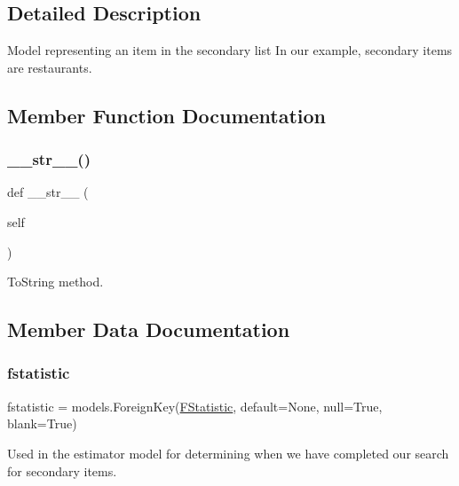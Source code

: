 \subsection{Detailed Description}
Model representing an item in the secondary list In our example, secondary items are restaurants. 

\subsection{Member Function Documentation}
\mbox{\label{classjoinapp_1_1models_1_1items_1_1_secondary_item_a23e8041ce1015febe4fdace3225714f9}} 
\subsubsection{\texorpdfstring{\_\_str\_\_()}{\_\_str\_\_()}}
{\footnotesize\ttfamily def \+\_\+\+\_\+str\+\_\+\+\_\+ (\begin{DoxyParamCaption}\item[{}]{self }\end{DoxyParamCaption})}



To\+String method. 



\subsection{Member Data Documentation}
\mbox{\label{classjoinapp_1_1models_1_1items_1_1_secondary_item_a5a67693c07b6818c102b3bfd0fc219cc}} 
\subsubsection{\texorpdfstring{fstatistic}{fstatistic}}
{\footnotesize\ttfamily fstatistic = models.\+Foreign\+Key(\mbox{\hyperlink{classjoinapp_1_1models_1_1estimator_1_1_f_statistic}{F\+Statistic}}, default=None, null=True, blank=True)\hspace{0.3cm}{\ttfamily [static]}}



Used in the estimator model for determining when we have completed our search for secondary items. 

